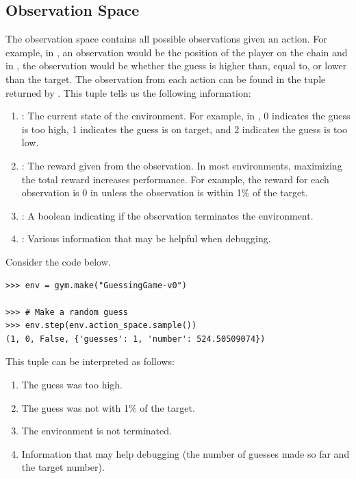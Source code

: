 \subsection*{Observation Space}

The observation space contains all possible observations given an action.
For example, in , an observation would be the position of the player on the chain and in , the observation would be whether the guess is higher than, equal to, or lower than the target.
The observation from each action can be found in the tuple returned by .
This tuple tells us the following information:
\begin{enumerate}
\item {}: The current state of the environment. For example, in , 0 indicates the guess is too high, 1 indicates the guess is on target, and 2 indicates the guess is too low.
\item {}: The reward given from the observation. In most environments, maximizing the total reward increases performance. For example, the reward for each observation is 0 in  unless the observation is within 1\% of the target.
\item {}: A boolean indicating if the observation terminates the environment.
\item {}: Various information that may be helpful when debugging.
\end{enumerate}
Consider the code below.

\begin{lstlisting}
>>> env = gym.make("GuessingGame-v0")

>>> # Make a random guess
>>> env.step(env.action_space.sample())
(1, 0, False, {'guesses': 1, 'number': 524.50509074})
\end{lstlisting}
This tuple can be interpreted as follows:
\begin{enumerate}
\item The guess was too high.
\item The guess was not with 1\% of the target.
\item The environment is not terminated.
\item Information that may help debugging (the number of guesses made so far and the target number).
\end{enumerate}

